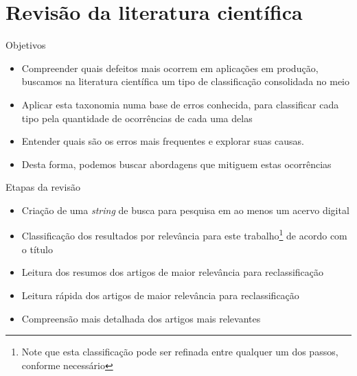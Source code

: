 \documentclass[brazilian]{beamer}
\begin{document}
\section{Revisão da literatura científica}

\begin{frame}{Objetivos}
    \begin{itemize}
        \item Compreender quais defeitos mais ocorrem em aplicações em produção, buscamos na literatura científica um tipo de classificação consolidada no meio
        \item Aplicar esta taxonomia numa base de erros conhecida, para classificar cada tipo pela quantidade de ocorrências de cada uma delas
        \item Entender quais são os erros mais frequentes e explorar suas causas. 
        \item Desta forma, podemos buscar abordagens que mitiguem estas ocorrências
    \end{itemize}
\end{frame}

\begin{frame}{Etapas da revisão}
    \begin{itemize}
        \item Criação de uma \textit{string} de busca para pesquisa em ao menos um acervo digital
        \item Classificação dos resultados por relevância para este trabalho\footnote{Note que esta classificação pode ser refinada entre qualquer um dos passos, conforme necessário} de acordo com o título
        \item Leitura dos resumos dos artigos de maior relevância para reclassificação
        \item Leitura rápida dos artigos de maior relevância para reclassificação
        \item Compreensão mais detalhada dos artigos mais relevantes
    \end{itemize}
\end{frame}
\end{document}
